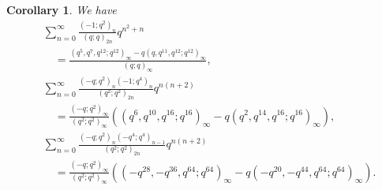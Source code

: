 \documentclass[reqno,12pt]{amsart}
\newtheorem{corollary}[theorem]{Corollary}
\theoremstyle{remark}
\numberwithin{equation}{section}
\begin{document}
\begin{corollary}
We have
\begin{align}
&\sum_{n=0}^{\infty}\frac{\left(-1;q^2\right)_n}{\left(q;q\right)_{2n}}q^{n^2+n}
\nonumber\\
&\quad
=\frac{\left(q^{5},q^{7},q^{12};q^{12}\right)_{\infty}
-q\left(q,q^{11},q^{12};q^{12}\right)_{\infty}}
{\left(q;q\right)_{\infty}},\tag{S.48}\label{S.48}\\
&\sum_{n=0}^{\infty}\frac{\left(-q;q^2\right)_n
\left(-1;q^4\right)_n}{\left(q^2;q^2\right)_{2n}}q^{n\left(n+2\right)}\nonumber\\
&\quad=\frac{\left(-q;q^2\right)_{\infty}}
{\left(q^2;q^2\right)_{\infty}}\left(\left(q^6,q^{10},q^{16};q^{16}\right)_{\infty}
-q\left(q^2,q^{14},q^{16};q^{16}\right)_{\infty}\right)
,\tag{S.67}\label{S.67}\\
&\sum_{n=0}^{\infty}\frac{\left(-q;q^2\right)_n
\left(-q^4;q^4\right)_{n-1}}
{\left(q^2;q^2\right)_{2n}}q^{n\left(n+2\right)}\nonumber\\
&\quad=\frac{\left(-q;q^2\right)_{\infty}
}
{\left(q^2;q^2\right)_{\infty}}\left(\left(-q^{28},-q^{36},q^{64};q^{64}\right)_{\infty}
-q\left(-q^{20},-q^{44},q^{64};q^{64}\right)_{\infty}\right)
.\tag{S.127}\label{S.127}
\end{align}
\end{corollary}
\end{document}

